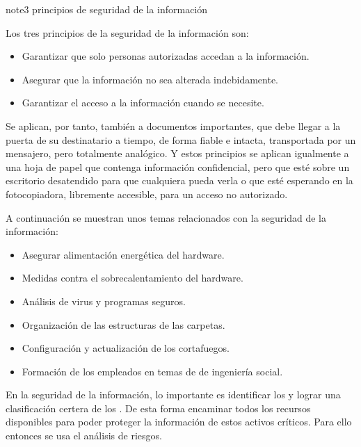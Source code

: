 \documentclass[letterpaper,10pt,spanish]{sphinxmanual}
\begin{document}
\begin{sphinxadmonition}{note}{3 principios de seguridad de la información}

\sphinxAtStartPar
Los tres principios de la seguridad de la información son:
\begin{itemize}
\item {} 
\sphinxAtStartPar
{} Garantizar que solo personas autorizadas accedan a la información.

\item {} 
\sphinxAtStartPar
{} Asegurar que la información no sea alterada indebidamente.

\item {} 
\sphinxAtStartPar
{} Garantizar el acceso a la información cuando se necesite.

\end{itemize}

\sphinxAtStartPar
Se aplican, por tanto, también a documentos importantes, que debe llegar a la puerta de su destinatario a tiempo, de forma fiable e intacta, transportada por un mensajero, pero totalmente analógico. Y estos principios se aplican igualmente a una hoja de papel que contenga información confidencial, pero que esté sobre un escritorio desatendido para que cualquiera pueda verla o que esté esperando en la fotocopiadora, libremente accesible, para un acceso no autorizado.

\sphinxAtStartPar
A continuación se muestran unos temas relacionados con la seguridad de la información:
\begin{itemize}
\item {} 
\sphinxAtStartPar
Asegurar alimentación energética del hardware.

\item {} 
\sphinxAtStartPar
Medidas contra el sobre\sphinxhyphen{}calentamiento del hardware.

\item {} 
\sphinxAtStartPar
Análisis de virus y programas seguros.

\item {} 
\sphinxAtStartPar
Organización de las estructuras de las carpetas.

\item {} 
\sphinxAtStartPar
Configuración y actualización de los cortafuegos.

\item {} 
\sphinxAtStartPar
Formación de los empleados en temas de de ingeniería social.

\end{itemize}

\sphinxAtStartPar
En la seguridad de la información, lo importante es identificar los  y lograr una clasificación certera de los . De esta forma encaminar todos los recursos disponibles para poder proteger la información de estos activos críticos. Para ello entonces se usa el análisis de riesgos.
\end{sphinxadmonition}
\end{document}
